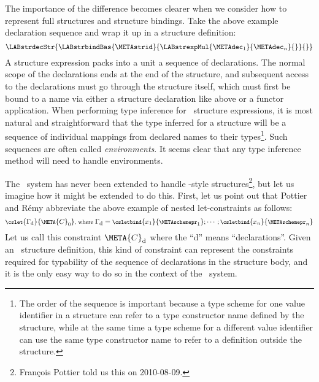 \documentclass{jfp1}
\newcommand{\sizeintablesp}{footnotesize}
\begin{document}

The importance of the difference becomes clearer when we consider how
to represent full structures and structure bindings.
Take the above example declaration sequence and wrap it up in a
structure definition:
$$
  \LABstrdecStr
    {\LABstrbindBas
       {\METAstrid}
       {\LABstrexpMul{\METAdec_1}{\METAdec_n}{}}
       {}}
$$
A structure expression packs into a unit a sequence of declarations.
The normal scope of the declarations ends at the end of the structure,
and subsequent access to the declarations must go through the
structure itself, which must first be bound to a name via either a
structure declaration like above or a functor application.
When performing type inference for \SML\ structure expressions, it is
most natural and straightforward that the type inferred for a
structure will be a sequence of individual mappings from
declared names to their types\footnote{
The order of the sequence is important because a type scheme for one
value identifier in a structure can refer to a type constructor name
defined by the structure, while at the same time a type scheme for a
different value identifier can use the same type constructor name to
refer to a definition outside the structure.}.
Such sequences are often called \textit{environments}.
It seems clear that any type inference method will need to handle
environments.

The \PR\ system has never been extended to handle \ML-style
structures\footnote{Fran\c{c}ois Pottier told us this on 2010-08-09.},
but let us imagine how it might be extended to do this.
First, let us point out that Pottier and R\'emy abbreviate the
above example of nested let-constraints as follows:
$$
\begin{\sizeintablesp}
\cslet{\Gamma_{\mathrm{d}}}{\META{C}_0}\mbox{, where }\Gamma_{\mbox{d}}=\csletbind{x_1}{\METAschemepr_1};\cdots;\csletbind{x_n}{\METAschemepr_n}
\end{\sizeintablesp}
$$
Let us call this constraint $\META{C}_{\mathrm{d}}$ where the ``d''
means ``declarations''.
Given an \SML\ structure definition, this kind of constraint can
represent the constraints required for typability of the sequence of
declarations in the structure body, and it is the only easy way to do
so in the context of the \PR\ system.
\end{document}
